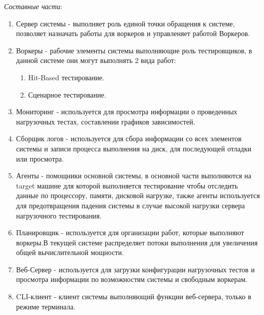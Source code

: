 \documentclass[PI,LAB]{HSEUniversity}
\begin{document}
\emph{Составные части}:
\begin{enumerate}
	\item Сервер системы - выполняет роль единой точки обращения к системе, позволяет назначать работы для воркеров и управленяет работой Воркеров.
	\item Воркеры - рабочие элементы системы выполняющие роль тестировщиков, в данной системе  они могут выполнять 2 вида работ:
	      \begin{enumerate}
		      \item Hit-Based тестирование.
		      \item Сценарное тестирование.
	      \end{enumerate}
	\item Мониторинг - используется для просмотра информации о проведенных нагрузочных тестах, составлении графиков зависимостей.
	\item Сборщик логов - используется для сбора информации со всех элементов системы и записи процесса выполнения на диск, для последующей отладки или просмотра.
	\item Агенты - помощники основной системы, в основной части выполняются на target машине для которой выполняется тестирование чтобы отследить данные по процессору, памяти, дисковой нагрузке, также агенты  используется для предотвращения падения системы в случае высокой нагрузки сервера нагрузочного тестирования.
	\item Планировщик - используется для организации работ, которые выполняют воркеры.В текущей системе распределяет потоки выполнения для увеличения общей вычислительной мощности.
	\item Веб-Сервер - используется для загрузки конфигурации нагрузочных тестов и просмотра информации по возможностям системы и свободным воркерам.
	\item CLI-клиент - клиент системы выполняющий функции веб-сервера, только в режиме терминала.
\end{enumerate}
\end{document}
